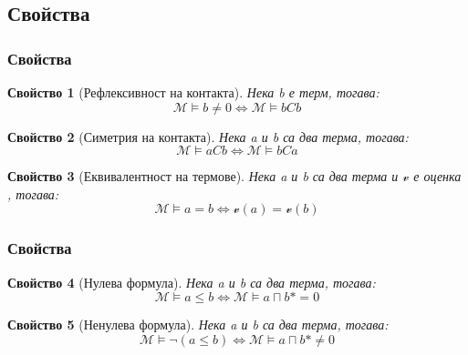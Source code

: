 \documentclass{beamer}
\newtheorem{prop}{Свойство}[section]
\begin{document}
\subsection{Свойства}
\begin{frame}\frametitle{Свойства}

\begin{prop}[Рефлексивност на контакта]
Нека b е терм, тогава:
	\begin{equation*}
		\mathcal{M} \models b \neq 0  \iff \mathcal{M} \models bCb
	\end{equation*}
\end{prop}

\begin{prop}[Симетрия на контакта]
Нека a и b са два терма, тогава:
	\begin{equation*}
		\mathcal{M} \models aCb \iff \mathcal{M} \models bCa
	\end{equation*}
\end{prop}

\begin{prop}[Еквивалентност на термове]
Нека a и b са два терма и $\mathscr{v}$ е оценка , тогава:
	\begin{equation*}
		\mathcal{M} \models a = b \iff \mathscr{v}(a) = \mathscr{v}(b)
	\end{equation*}
\end{prop}

\end{frame}
\begin{frame}\frametitle{Свойства}
\begin{prop}[Нулева формула]

Нека a и b са два терма, тогава:
	\begin{equation*}
		\mathcal{M} \models a \le b \iff \mathcal{M} \models a \sqcap b* = 0
	\end{equation*}
\end{prop}

\begin{prop}[Ненулева формула]
Нека a и b са два терма, тогава:
	\begin{equation*}
		\mathcal{M} \models \neg(a \le b) \iff \mathcal{M} \models a \sqcap b* \neq 0
	\end{equation*}
\end{prop}

\end{frame}
\end{document}
